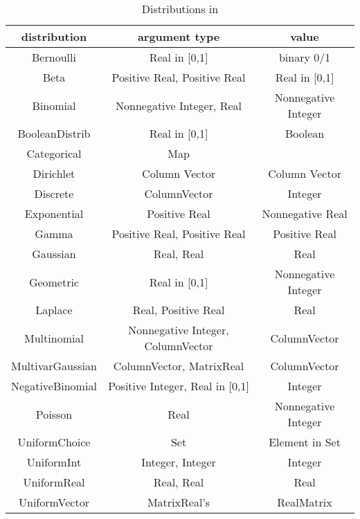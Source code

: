 \begin{table}[H]
\centering
\caption{Distributions in \bl}
\begin{tabular}{ c c c }
\toprule
distribution & argument type & value \\
 \midrule
Bernoulli & Real in [0,1] & binary 0/1 \\
Beta & Positive Real, Positive Real & Real in [0,1]  \\
Binomial & Nonnegative Integer, Real & Nonnegative Integer \\
BooleanDistrib & Real in [0,1] & Boolean \\
Categorical & Map &  \\
Dirichlet & Column Vector & Column Vector \\
Discrete & ColumnVector & Integer \\
Exponential & Positive Real & Nonnegative Real \\
Gamma & Positive Real, Positive Real & Positive Real \\
Gaussian & Real, Real & Real  \\
Geometric & Real in [0,1] & Nonnegative Integer \\
Laplace & Real, Positive Real & Real  \\
Multinomial & Nonnegative Integer, ColumnVector & ColumnVector \\
MultivarGaussian & ColumnVector, MatrixReal & ColumnVector  \\
NegativeBinomial & Positive Integer, Real in [0,1] & Integer  \\
Poisson & Real & Nonnegative Integer  \\
UniformChoice & Set & Element in Set \\
UniformInt & Integer, Integer & Integer  \\
UniformReal & Real, Real & Real  \\
UniformVector & MatrixReal's & RealMatrix \\
 \bottomrule
\end{tabular}
\end{table}
